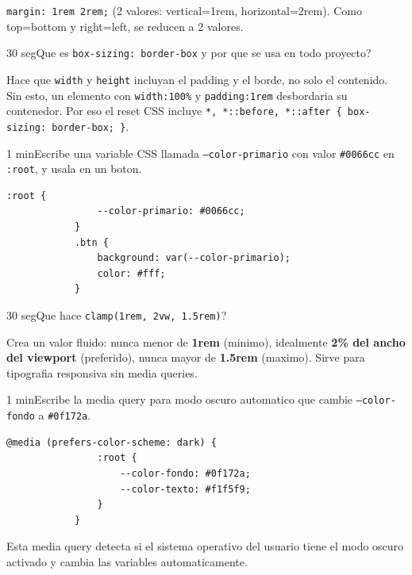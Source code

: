 \documentclass[11pt,a4paper]{article}
\newcounter{nej}
\newcommand{\ej}[2]{%
	\stepcounter{nej}%
	\begin{ejercicio}{\arabic{nej}}{#1}#2\end{ejercicio}\vspace{4pt}}
\begin{document}
	\begin{respuesta}
		\texttt{margin: 1rem 2rem;} (2 valores: vertical=1rem, horizontal=2rem). Como top=bottom y right=left, se reducen a 2 valores.
	\end{respuesta}
	\vspace{6pt}
	
	\ej{30 seg}{Que es \texttt{box-sizing: border-box} y por que se usa en todo proyecto?}
	
	\begin{respuesta}
		Hace que \texttt{width} y \texttt{height} incluyan el padding y el borde, no solo el contenido. Sin esto, un elemento con \texttt{width:100\%} y \texttt{padding:1rem} desbordaria su contenedor. Por eso el reset CSS incluye \texttt{*, *::before, *::after \{ box-sizing: border-box; \}}.
	\end{respuesta}
	\vspace{6pt}
	
	\ej{1 min}{Escribe una variable CSS llamada \texttt{--color-primario} con valor \texttt{\#0066cc} en \texttt{:root}, y usala en un boton.}
	
	\begin{respuesta}
		\begin{lstlisting}[style=codecss]
			:root {
				--color-primario: #0066cc;
			}
			.btn {
				background: var(--color-primario);
				color: #fff;
			}
		\end{lstlisting}
	\end{respuesta}
	\vspace{6pt}
	
	\ej{30 seg}{Que hace \texttt{clamp(1rem, 2vw, 1.5rem)}?}
	
	\begin{respuesta}
		Crea un valor fluido: nunca menor de \textbf{1rem} (minimo), idealmente \textbf{2\% del ancho del viewport} (preferido), nunca mayor de \textbf{1.5rem} (maximo). Sirve para tipografia responsiva sin media queries.
	\end{respuesta}
	\vspace{6pt}
	
	\ej{1 min}{Escribe la media query para modo oscuro automatico que cambie \texttt{--color-fondo} a \texttt{\#0f172a}.}
	
	\begin{respuesta}
		\begin{lstlisting}[style=codecss]
			@media (prefers-color-scheme: dark) {
				:root {
					--color-fondo: #0f172a;
					--color-texto: #f1f5f9;
				}
			}
		\end{lstlisting}
		Esta media query detecta si el sistema operativo del usuario tiene el modo oscuro activado y cambia las variables automaticamente.
	\end{respuesta}
	\vspace{6pt}
	
\end{document}
